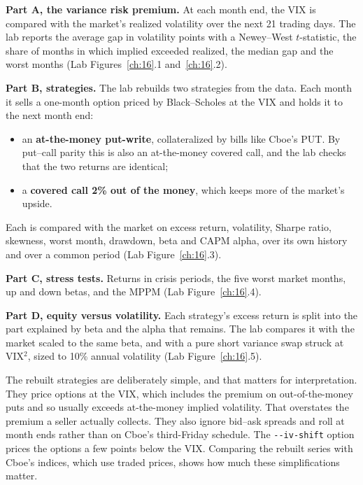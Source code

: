 \textbf{Part A, the variance risk premium.} At each month end, the VIX is compared with the market's realized volatility over the next 21 trading days. The lab reports the average gap in volatility points with a Newey--West $t$-statistic, the share of months in which implied exceeded realized, the median gap and the worst months (Lab Figures~\ref{ch:16}.1 and~\ref{ch:16}.2).

\textbf{Part B, strategies.} The lab rebuilds two strategies from the data. Each month it sells a one-month option priced by Black--Scholes at the VIX and holds it to the next month end:

\begin{itemize}
  \item an \textbf{at-the-money put-write}, collateralized by bills like Cboe's PUT. By put--call parity this is also an at-the-money covered call, and the lab checks that the two returns are identical;
  \item a \textbf{covered call 2\% out of the money}, which keeps more of the market's upside.
\end{itemize}

Each is compared with the market on excess return, volatility, Sharpe ratio, skewness, worst month, drawdown, beta and CAPM alpha, over its own history and over a common period (Lab Figure~\ref{ch:16}.3).

\textbf{Part C, stress tests.} Returns in crisis periods, the five worst market months, up and down betas, and the MPPM (Lab Figure~\ref{ch:16}.4).

\textbf{Part D, equity versus volatility.} Each strategy's excess return is split into the part explained by beta and the alpha that remains. The lab compares it with the market scaled to the same beta, and with a pure short variance swap struck at VIX$^2$, sized to 10\% annual volatility (Lab Figure~\ref{ch:16}.5).

The rebuilt strategies are deliberately simple, and that matters for interpretation. They price options at the VIX, which includes the premium on out-of-the-money puts and so usually exceeds at-the-money implied volatility. That overstates the premium a seller actually collects. They also ignore bid--ask spreads and roll at month ends rather than on Cboe's third-Friday schedule. The \texttt{-{}-iv-shift} option prices the options a few points below the VIX. Comparing the rebuilt series with Cboe's indices, which use traded prices, shows how much these simplifications matter.

